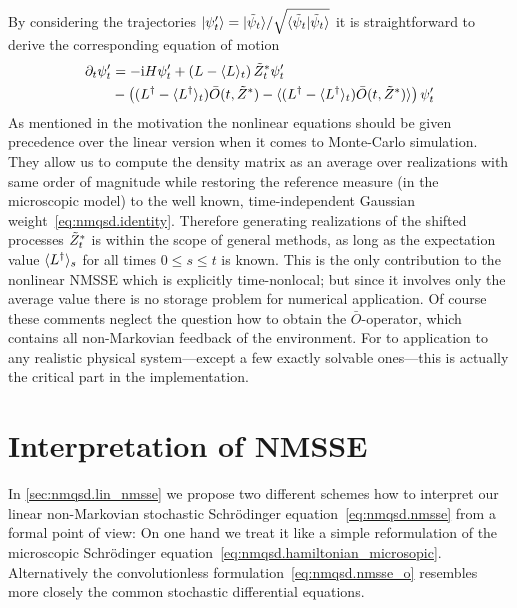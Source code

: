 By considering the trajectories $| \psi'_t \rangle = | \tilde\psi_t \rangle / \sqrt{\langle \tilde\psi_t | \tilde\psi_t \rangle}$ it is straightforward to derive the corresponding equation of motion \cite{???}
\begin{align}
  \partial_t\psi'_t &= -\mathrm{i}H\psi'_t  +  \left(L - \langle L \rangle_t\right) {\tilde Z}^*_t\psi'_t  \nonumber \\
  &-  \left( (L^\dagger - \langle L^\dagger \rangle_t) \bar O(t, {\tilde Z}^*) - \langle (L^\dagger - \langle L^\dagger \rangle_t) \bar O(t, {\tilde Z}^*) \rangle \right) \psi'_t
  \label{eq:nmqsd.nmsse_nonlin_full}
\end{align}
As mentioned in the motivation the nonlinear equations should be given precedence over the linear version when it comes to Monte-Carlo simulation.
They allow us to compute the density matrix as an average over realizations with same order of magnitude while restoring the reference measure (in the microscopic model) to the well known, time-independent Gaussian weight~\ref{eq:nmqsd.identity}.
Therefore generating realizations of the shifted processes ${\tilde Z}^*_t$ is within the scope of general methods, as long as the expectation value $\langle L^\dagger \rangle_s$ for all times $0 \le s \le t$ is known.
This is the only contribution to the nonlinear NMSSE which is explicitly time-nonlocal;
but since it involves only the average value there is no storage problem for numerical application.
Of course these comments neglect the question how to obtain the $\bar O$-operator, which contains all non-Markovian feedback of the environment.
For to application to any realistic physical system---except a few exactly solvable ones---this is actually the critical part in the implementation.


\section{Interpretation of NMSSE}
\label{sec:nmqsd.interpretation}
%

In \autoref{sec:nmqsd.lin_nmsse} we propose two different schemes how to interpret our linear non-Markovian stochastic Schrödinger equation~\ref{eq:nmqsd.nmsse} from a formal point of view:
On one hand we treat it like a simple reformulation of the microscopic Schrödinger equation~\ref{eq:nmqsd.hamiltonian_microsopic}.
Alternatively the convolutionless formulation~\ref{eq:nmqsd.nmsse_o} resembles more closely the common stochastic differential equations.

